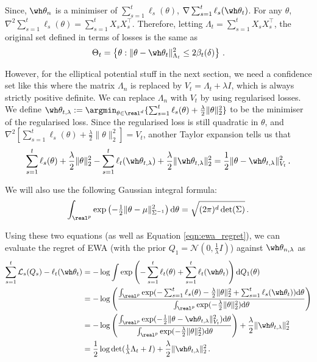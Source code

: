 Since, $\wh\theta_n$ is a minimiser of $\sum_{s=1}^{t}\ell_s(\theta)$, $\nabla\sum_{s=1}^{t}\ell_s(\wh\theta_t)$. For any $\theta$, $\nabla^2\sum_{s=1}^{t}\ell_s(\theta) = \sum_{s=1}^{t}X_sX_s^{\top}$. Therefore, letting $\Lambda_t = \sum_{s=1}^{t}X_sX_s^{\top}$, the original set defined in terms of losses is the same as
\begin{equation*}
\Theta_t = \left\{\theta: \|\theta - \wh \theta_t\|_{\Lambda_t}^2 \leq 2\beta_t(\delta)\right\}\,.
\end{equation*}

However, for the elliptical potential stuff in the next section, we need a confidence set like this where the matrix $\Lambda_n$ is replaced by $V_t= \Lambda_t + \lambda I$, which is always strictly positive definite. We can replace $\Lambda_n$ with $V_t$ by using regularised losses. We define $\wh\theta_{t,\lambda} := \argmin_{\theta \in \real^d}\{\sum_{s=1}^{t}\ell_s(\theta) + \frac{\lambda}{2}\|\theta\|_2^2\}$ to be the minimiser of the regularised loss. Since the regularised loss is still quadratic in $\theta$, and $\nabla^2[\sum_{s=1}^{t}\ell_s(\theta) + \frac{\lambda}{2}\|\theta\|_2^2] = V_t$, another Taylor expansion tells us that
\begin{equation}
\sum_{s=1}^{t}\ell_s(\theta) + \frac{\lambda}{2}\|\theta\|_2^2 - \sum_{s=1}^{t}\ell_t(\wh\theta_{t,\lambda}) + \frac{\lambda}{2}\|\wh\theta_{t,\lambda}\|_2^2 = \frac{1}{2}\|\theta - \wh\theta_{t,\lambda}\|_{V_t}^2\,.
\label{eqn:reg_loss_taylor}
\end{equation}

We will also use the following Gaussian integral formula:
\begin{equation*}
\int_{\real^p}\exp\left(-\tfrac{1}{2}\|\theta - \mu\|_{\Sigma^{-1}}^2\right)\mathrm{d}\theta = \sqrt{(2\pi)^d\det(\Sigma)}\,.
\end{equation*}

Using these two equations (as well as Equation \eqref{eqn:ewa_regret}), we can evaluate the regret of EWA (with the prior $Q_1 = \mathcal{N}(0, \frac{1}{\lambda}I)$) against $\wh\theta_{n,\lambda}$ as
\begin{align*}
\sum_{s=1}^t \mathcal{L}_s(Q_s)-\ell_t(\wh \theta_t) &= -\log\int \exp\left(-\sum_{s=1}^{t}\ell_t(\theta) + \sum_{s=1}^{t}\ell_t(\wh\theta_t)\right)\mathrm{d}Q_1(\theta)\\
&= -\log\left(\frac{\int_{\real^p}\exp(-\sum_{s=1}^{t}\ell_s(\theta) - \frac{\lambda}{2}\|\theta\|_2^2 + \sum_{s=1}^{t}\ell_s(\wh\theta_t))\mathrm{d}\theta}{\int_{\real^p}\exp(-\frac{\lambda}{2}\|\theta\|_2^2)\mathrm{d}\theta}\right)\\
&= -\log\left(\frac{\int_{\real^p}\exp(-\frac{1}{2}\|\theta - \wh\theta_{t,\lambda}\|_{V_t}^2)\mathrm{d}\theta}{\int_{\real^p}\exp(-\frac{\lambda}{2}\|\theta\|_2^2)\mathrm{d}\theta}\right) + \frac{\lambda}{2}\|\wh\theta_{t,\lambda}\|_2^2\\
&= \frac{1}{2}\log\det(\tfrac{1}{\lambda}\Lambda_t + I) + \frac{\lambda}{2}\|\wh\theta_{t,\lambda}\|_2^2\,.
\end{align*}

